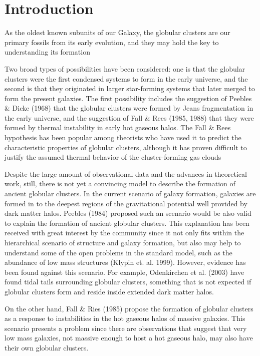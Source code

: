 \chapter{Introduction}

As the oldest known subunits of our Galaxy, the globular clusters are our primary
fossils from its early evolution, and they may hold the key to understanding
its formation

Two
broad types of possibilities have been considered: one is that the globular clusters
were the first condensed systems to form in the early universe, and the second is
that they originated in larger star-forming systems that later merged to form the
present galaxies. The first possibility includes the suggestion of Peebles \& Dicke
(1968) that the globular clusters were formed by Jeans fragmentation in the early
universe, and the suggestion of Fall \& Rees (1985, 1988) that they were formed
by thermal instability in early hot gaseous halos. The Fall \& Rees hypothesis
has been popular among theorists who have used it to predict the characteristic
properties of globular clusters, although it has proven difficult to justify the
assumed thermal behavior of the cluster-forming gas clouds

Despite the large amount of observational data and the advances in theoretical work, still, there is not yet a convincing model to describe the formation of ancient globular clusters. In the current scenario of galaxy formation, galaxies are formed in to the deepest regions of the gravitational potential well provided by dark matter halos. Peebles (1984) proposed such an scenario would be also valid to explain the formation of ancient globular clusters. This explanation has been received with great interest by the community since it not only fits within the hierarchical scenario of structure and galaxy formation, but also may help to understand some of the open problems in the standard model, such as the abundance of low mass structures (Klypin et. al. 1999). However, evidence has been found against this scenario. For example, Odenkirchen et al. (2003) have found tidal tails surrounding globular clusters, something that is not expected if globular clusters form and reside inside extended dark matter halos.

On the other hand, Fall \& Ries (1985) propose the formation of globular clusters as a response to instabilities in the hot gaseous halos of massive galaxies. This scenario presents a problem since there are observations that suggest that very low mass galaxies, not massive enough to host a hot gaseous halo, may also have their own globular clusters.

